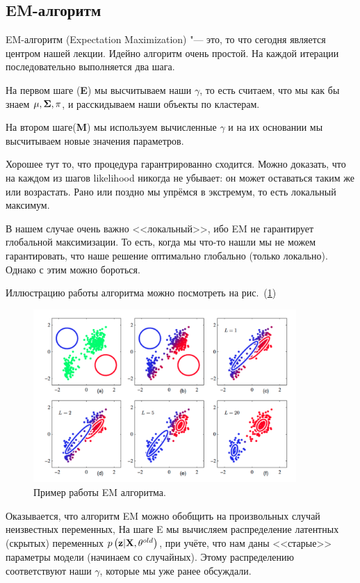 \subsection{EM-алгоритм}
EM-алгоритм (Expectation Maximization)
 "--- это, то что сегодня является центром нашей лекции.
Идейно алгоритм очень простой. На каждой итерации последовательно выполняется два шага. 

На первом шаге ({\bf E}) мы высчитываем наши $\gamma$, то есть считаем, что мы как бы знаем $\mu, {\bf \Sigma}, \pi$, и расскидываем наши объекты по кластерам.

На втором шаге({\bf M}) мы используем вычисленные $\gamma$ и на их основании мы высчитываем новые значения параметров.

Хорошее тут то, что процедура гарантрированно сходится.
Можно доказать, что на каждом из шагов likelihood никогда не убывает: он может оставаться таким же или возрастать. Рано или поздно мы упрёмся в экстремум, то есть локальный максимум.
\begin{Zam}
В нашем случае очень важно <<локальный>>, ибо EM не гарантирует глобальной максимизации. То есть, когда мы что-то нашли мы не можем гарантировать, что наше решение оптимально глобально (только локально). Однако с этим можно бороться.
\end{Zam} 

Иллюстрацию работы алгоритма можно посмотреть на рис.~(\ref{EM})

\begin{figure}[H]
\centering
    \includegraphics[width=100mm]{images/EM.png}
    \caption{Пример работы EM алгоритма.}
    \label{EM}
\end{figure}

Оказывается, что алгоритм EM можно обобщить на произвольных случай неизвестных переменных,
На шаге E мы вычисляем распределение латентных (скрытых) переменных $p \left({\bf z| X}, \theta^{old}\right)$, при учёте, что нам даны <<старые>> параметры модели (начинаем со случайных). Этому распределению соответствуют наши $\gamma$, которые мы уже ранее обсуждали.


